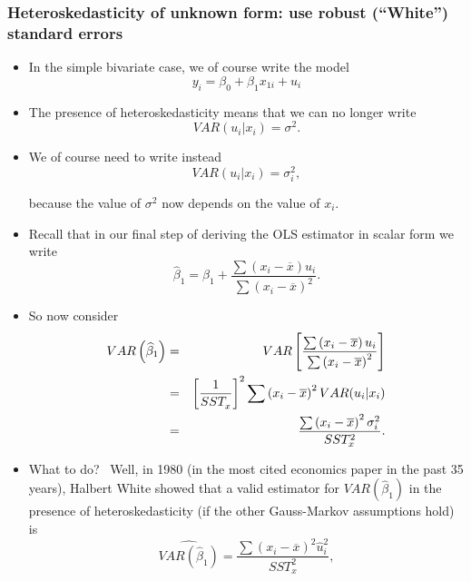 \documentclass[11pt]{article}
\begin{document}
\subsubsection{Heteroskedasticity of unknown form: use robust
(\textquotedblleft White\textquotedblright ) standard errors}

\begin{itemize}
\item In the simple bivariate case, we of course write the model%
\begin{equation*}
y_{i}=\beta _{0}+\beta _{1}x_{1i}+u_{i}
\end{equation*}

\item The presence of heteroskedasticity means that we can no longer write%
\begin{equation*}
VAR(u_{i}|x_{i})=\sigma ^{2}.
\end{equation*}

\item We of course need to write instead%
\begin{equation*}
VAR(u_{i}|x_{i})=\sigma _{i}^{2},
\end{equation*}

because the value of $\sigma ^{2}$ now depends on the value of $x_{i}$.

\item Recall that in our final step of deriving the OLS estimator in scalar
form we write%
\begin{equation*}
\widehat{\beta }_{1}=\beta _{1}+\frac{\sum \left( x_{i}-\overline{x}\right)
u_{i}}{\sum \left( x_{i}-\overline{x}\right) ^{2}}.
\end{equation*}

\item So now consider 
\begin{eqnarray*}
VAR\left( \widehat{\beta }_{1}\right) &=&VAR\left[ \frac{\sum \left( x_{i}-%
\overline{x}\right) u_{i}}{\sum \left( x_{i}-\overline{x}\right) ^{2}}\right]
\\
&=&\left[ \frac{1}{SST_{x}^{{}}}\right] ^{2}\sum \left( x_{i}-\overline{x}%
\right) ^{2}VAR(u_{i}|x_{i}) \\
&=&\frac{\sum \left( x_{i}-\overline{x}\right) ^{2}\sigma _{i}^{2}}{%
SST_{x}^{2}}.
\end{eqnarray*}

\item What to do? \ Well, in 1980 (in the most cited economics paper in the
past 35 years), Halbert White showed that a valid estimator for $VAR\left( 
\widehat{\beta }_{1}\right) $ in the presence of heteroskedasticity (if the
other Gauss-Markov assumptions hold) is%
\begin{equation*}
\widehat{VAR\left( \widehat{\beta }_{1}\right) }=\frac{\sum \left( x_{i}-%
\overline{x}\right) ^{2}\widehat{u}_{i}^{2}}{SST_{x}^{2}},
\end{equation*}


\end{itemize}
\end{document}

